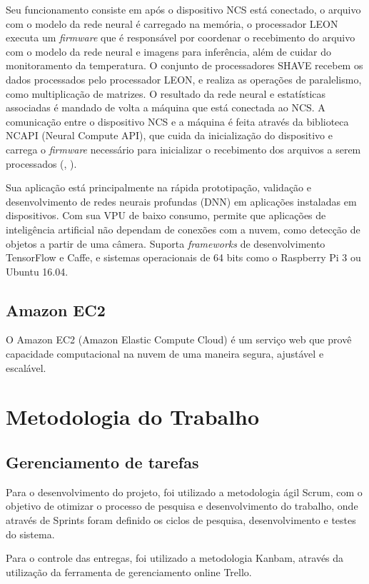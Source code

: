 \documentclass[]{politex}
\begin{document}
Seu funcionamento consiste em após o dispositivo NCS está conectado, o arquivo com o modelo da rede neural é carregado na memória, o processador LEON executa um \textit{firmware} que é responsável por coordenar o recebimento do arquivo com o modelo da rede neural e imagens para inferência, além de cuidar do monitoramento da temperatura. O conjunto de processadores SHAVE recebem os dados processados pelo processador LEON, e realiza as operações de paralelismo, como multiplicação de matrizes. O resultado da rede neural e estatísticas associadas é mandado de volta a máquina que está conectada ao NCS. A comunicação entre o dispositivo NCS e a máquina é feita através da biblioteca NCAPI (Neural Compute API), que cuida da inicialização do dispositivo e carrega o \textit{firmware} necessário para inicializar o recebimento dos arquivos a serem processados (, \citeyear{intel_movidius}).  

Sua aplicação está principalmente na rápida prototipação, validação e desenvolvimento de redes neurais profundas (DNN) em aplicações instaladas em dispositivos. Com sua VPU de baixo consumo, permite que aplicações de inteligência artificial não dependam de conexões com a nuvem, como detecção de objetos a partir de uma câmera. Suporta \textit{frameworks} de desenvolvimento TensorFlow e Caffe, e sistemas operacionais de 64 bits como o Raspberry Pi 3 ou Ubuntu 16.04.


\section{Amazon EC2}
O Amazon EC2 (Amazon Elastic Compute Cloud) é um serviço web que provê capacidade computacional na nuvem de uma maneira segura, ajustável e escalável.


\chapter{Metodologia do Trabalho}

\section{Gerenciamento de tarefas}
Para o desenvolvimento do projeto, foi utilizado a metodologia ágil Scrum, com o objetivo de otimizar o processo de pesquisa e desenvolvimento do trabalho, onde através de Sprints foram definido os ciclos de pesquisa, desenvolvimento e testes do sistema.

Para o controle das entregas, foi utilizado a metodologia Kanbam, através da utilização da ferramenta de gerenciamento online Trello.
\end{document}

